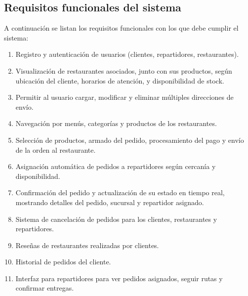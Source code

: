 \subsection{Requisitos funcionales del sistema}

A continuación se listan los requisitos funcionales con los que debe cumplir el sistema:

\begin{enumerate}
    \item Registro y autenticación de usuarios (clientes, repartidores, restaurantes).

    \item Visualización de restaurantes asociados, junto con sus productos, según ubicación del cliente, horarios de atención, y disponibilidad de stock.
    
    \item Permitir al usuario cargar, modificar y eliminar múltiples direcciones de envío.
    
    \item Navegación por menús, categorías y productos de los restaurantes.
    
    \item Selección de productos, armado del pedido, procesamiento del pago y envío de la orden al restaurante.
    
    \item Asignación automática de pedidos a repartidores según cercanía y disponibilidad.
    
    \item Confirmación del pedido y actualización de su estado en tiempo real, mostrando detalles del pedido, sucursal y repartidor asignado.
    
    \item Sistema de cancelación de pedidos para los clientes, restaurantes y repartidores.
    
    \item Reseñas de restaurantes realizadas por clientes.
    
    \item Historial de pedidos del cliente.
    
    
    \item Interfaz para repartidores para ver pedidos asignados, seguir rutas y confirmar entregas.
    

\end{enumerate}
